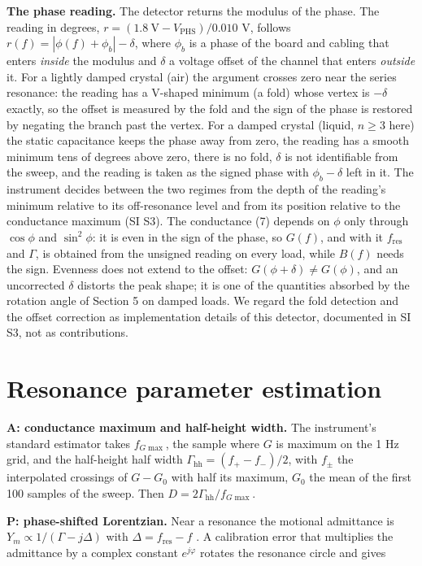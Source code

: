 \documentclass[11pt,a4paper]{article}
\begin{document}
\textbf{The phase reading.} The detector returns the modulus of the phase. The reading in degrees, $r = (1.8\ \mathrm{V} - V_\mathrm{PHS})/0.010$ V, follows $r(f) = |\phi(f) + \phi_b| - \delta$, where $\phi_b$ is a phase of the board and cabling that enters \emph{inside} the modulus and $\delta$ a voltage offset of the channel that enters \emph{outside} it. For a lightly damped crystal (air) the argument crosses zero near the series resonance: the reading has a V-shaped minimum (a fold) whose vertex is $-\delta$ exactly, so the offset is measured by the fold and the sign of the phase is restored by negating the branch past the vertex. For a damped crystal (liquid, $n \ge 3$ here) the static capacitance keeps the phase away from zero, the reading has a smooth minimum tens of degrees above zero, there is no fold, $\delta$ is not identifiable from the sweep, and the reading is taken as the signed phase with $\phi_b - \delta$ left in it. The instrument decides between the two regimes from the depth of the reading's minimum relative to its off-resonance level and from its position relative to the conductance maximum (SI S3). The conductance (7) depends on $\phi$ only through $\cos\phi$ and $\sin^2\phi$: it is even in the sign of the phase, so $G(f)$, and with it $f_\mathrm{res}$ and $\Gamma$, is obtained from the unsigned reading on every load, while $B(f)$ needs the sign. Evenness does not extend to the offset: $G(\phi + \delta) \ne G(\phi)$, and an uncorrected $\delta$ distorts the peak shape; it is one of the quantities absorbed by the rotation angle of Section 5 on damped loads. We regard the fold detection and the offset correction as implementation details of this detector, documented in SI S3, not as contributions.

\section{Resonance parameter estimation}

\textbf{A: conductance maximum and half-height width.} The instrument's standard estimator takes $f_{G\max}$, the sample where $G$ is maximum on the 1 Hz grid, and the half-height half width $\Gamma_\mathrm{hh} = (f_+ - f_-)/2$, with $f_\pm$ the interpolated crossings of $G - G_0$ with half its maximum, $G_0$ the mean of the first 100 samples of the sweep. Then $D = 2\Gamma_\mathrm{hh}/f_{G\max}$.

\textbf{P: phase-shifted Lorentzian.} Near a resonance the motional admittance is $Y_m \propto 1/(\Gamma - j\Delta)$ with $\Delta = f_\mathrm{res} - f$ \citep{Johannsmann2021}. A calibration error that multiplies the admittance by a complex constant $e^{j\varphi}$ rotates the resonance circle and gives
\end{document}
